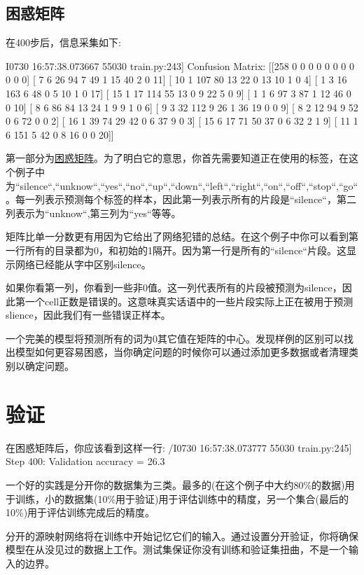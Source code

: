 \subsection{困惑矩阵}
在400步后，信息采集如下:
\begin{python}
I0730 16:57:38.073667   55030 train.py:243] Confusion Matrix:
 [[258   0   0   0   0   0   0   0   0   0   0   0]
 [  7   6  26  94   7  49   1  15  40   2   0  11]
 [ 10   1 107  80  13  22   0  13  10   1   0   4]
 [  1   3  16 163   6  48   0   5  10   1   0  17]
 [ 15   1  17 114  55  13   0   9  22   5   0   9]
 [  1   1   6  97   3  87   1  12  46   0   0  10]
 [  8   6  86  84  13  24   1   9   9   1   0   6]
 [  9   3  32 112   9  26   1  36  19   0   0   9]
 [  8   2  12  94   9  52   0   6  72   0   0   2]
 [ 16   1  39  74  29  42   0   6  37   9   0   3]
 [ 15   6  17  71  50  37   0   6  32   2   1   9]
 [ 11   1   6 151   5  42   0   8  16   0   0  20]]
\end{python}
第一部分为\href{https://www.tensorflow.org/api_docs/python/tf/confusion_matrix}{困惑矩阵}。为了明白它的意思，你首先需要知道正在使用的标签，在这个例子中为``silence``,``unknow``,``yes``,``no``,``up``,``down``,``left``,``right``,``on``,``off``,``stop``,``go``。每一列表示预测每个标签的样本，因此第一列表示所有的片段是``silence``，第二列表示为``unknow``,第三列为``yes``等等。

矩阵比单一分数更有用因为它给出了网络犯错的总结。在这个例子中你可以看到第一行所有的目录都为0，和初始的1隔开。因为第一行是所有的``silence``片段。这显示网络已经能从字中区别silence。

如果你看第一列，你看到一些非0值。这一列代表所有的片段被预测为silence，因此第一个cell正数是错误的。这意味真实话语中的一些片段实际上正在被用于预测slience，因此我们有一些错误正样本。

一个完美的模型将预测所有的词为0其它值在矩阵的中心。发现样例的区别可以找出模型如何更容易困惑，当你确定问题的时候你可以通过添加更多数据或者清理类别以确定问题。
\section{验证}
在困惑矩阵后，你应该看到这样一行:
\bash/I0730 16:57:38.073777 55030 train.py:245] Step 400: Validation accuracy = 26.3%

一个好的实践是分开你的数据集为三类。最多的(在这个例子中大约80\%的数据)用于训练，小的数据集(10\%用于验证)用于评估训练中的精度，另一个集合(最后的10\%)用于评估训练完成后的精度。

分开的源映射网络将在训练中开始记忆它们的输入。通过设置分开验证，你将确保模型在从没见过的数据上工作。测试集保证你没有训练和验证集扭曲，不是一个输入的边界。

